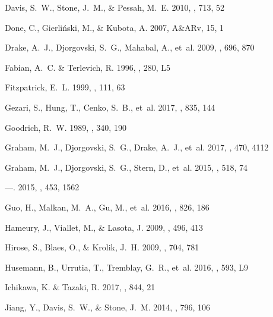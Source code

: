 \documentclass[iop]{emulateapj}
\begin{document}
\begin{thebibliography}{84}
Davis, S.~W., Stone, J.~M., \& Pessah, M.~E. 2010, \apj, 713, 52

Done, C., Gierli{\'n}ski, M., \& Kubota, A. 2007, A\&ARv, 15, 1

Drake, A.~J., Djorgovski, S.~G., Mahabal, A., {et~al.} 2009, \apj, 696, 870

Fabian, A.~C. \& Terlevich, R. 1996, \mnras, 280, L5

Fitzpatrick, E.~L. 1999, \pasp, 111, 63

Gezari, S., Hung, T., Cenko, S.~B., {et~al.} 2017, \apj, 835, 144

Goodrich, R.~W. 1989, \apj, 340, 190

Graham, M.~J., Djorgovski, S.~G., Drake, A.~J., {et~al.} 2017, \mnras, 470,
  4112

Graham, M.~J., Djorgovski, S.~G., Stern, D., {et~al.} 2015{}, \nat,
  518, 74

---. 2015{}, \mnras, 453, 1562

Guo, H., Malkan, M.~A., Gu, M., {et~al.} 2016, \apj, 826, 186

Hameury, J., Viallet, M., \& Lasota, J. 2009, \aap, 496, 413

Hirose, S., Blaes, O., \& Krolik, J.~H. 2009, \apj, 704, 781

Husemann, B., Urrutia, T., Tremblay, G.~R., {et~al.} 2016, \aap, 593, L9

Ichikawa, K. \& Tazaki, R. 2017, \apj, 844, 21

Jiang, Y., Davis, S.~W., \& Stone, J.~M. 2014, \apj, 796, 106


\end{thebibliography}
\end{document}
